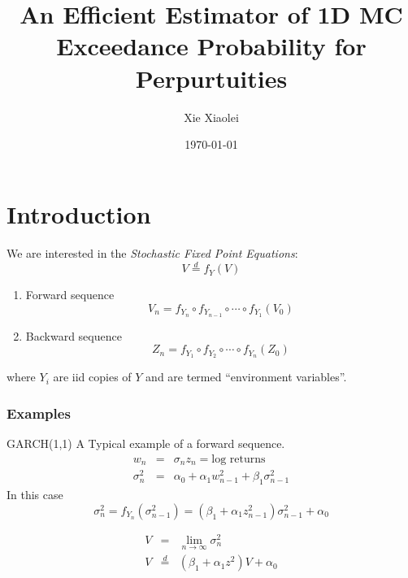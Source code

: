 \documentclass{beamer}
\title{An Efficient Estimator of 1D MC Exceedance Probability for
  Perpurtuities}
\author{Xie Xiaolei} %
\institute[UCPH] %
{
Copenhagen University  \\ %
\medskip
\textit{xie@math.ku.dk} %
}
\date{\today} %
\begin{document}
\begin{frame}
\titlepage %
\end{frame}


\section{Introduction}
\begin{frame}
  We are interested in the {\it Stochastic Fixed Point Equations}:
  \[
  V \overset{d}{=} f_Y(V)
  \]
  \begin{enumerate}
  \item Forward sequence
    \[
    V_n = f_{Y_n} \circ f_{Y_{n-1}} \circ \cdots \circ f_{Y_1} (V_0)
    \]
    \item Backward sequence
      \[
      Z_n  = f_{Y_1} \circ f_{Y_{2}} \circ \cdots \circ f_{Y_n} (Z_0)
      \]
    \end{enumerate}
    where $Y_i$ are iid copies of $Y$ and are termed ``environment
    variables''.
\end{frame}

\begin{frame}
  \frametitle{Examples}
  \begin{exampleblock}{GARCH(1,1)}
    A Typical example of a forward sequence.
    \begin{eqnarray*}
      w_n &=& \sigma_n z_n = \text{log returns} \\
      \sigma_n^2 &=& \alpha_0 + \alpha_1 w_{n-1}^2 + \beta_1 \sigma_{n-1}^2
    \end{eqnarray*}
    In this case
    \[
    \sigma_n^2 = f_{Y_n} (\sigma_{n-1}^2) =
    (\beta_1 + \alpha_1 z_{n-1}^2) \sigma_{n-1}^2
    + \alpha_0
    \]
  \end{exampleblock}
    \begin{eqnarray*}
      V &=& \lim_{n \to \infty} \sigma_n^2   \\
      V &\overset{d}{=}& (\beta_1 + \alpha_1 z^2) V + \alpha_0
    \end{eqnarray*}
\end{frame}
\end{document}
